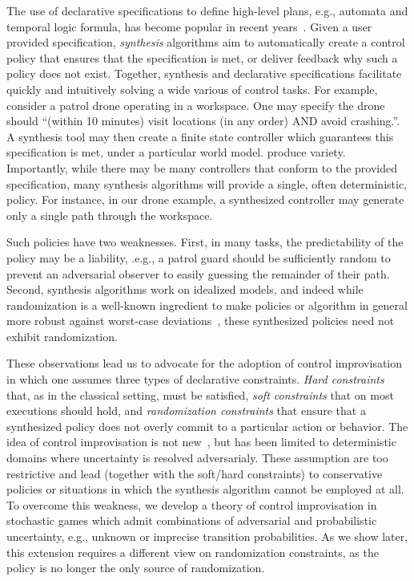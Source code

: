 The use of declarative specifications to define high-level plans, e.g.,
automata and temporal logic formula, has become popular in recent
years~\cite{DBLP:conf/iros/HorowitzWM14, DBLP:conf/rss/WongEK14, DBLP:conf/iros/HeLKV17, DBLP:conf/icra/FuATP16, DBLP:conf/icra/HeWKV19, DBLP:journals/arobots/MoarrefK20, DBLP:conf/icra/KantarosM0P20}.
Given a user provided specification, \emph{synthesis} algorithms aim
to automatically create a control policy that ensures that the
specification is met, or deliver feedback why such a policy does not
exist. Together, synthesis and declarative specifications facilitate
quickly and intuitively solving a wide various of control tasks.  For
example, consider a patrol drone operating in a workspace. One may
specify the drone should ``(within 10 minutes) visit locations (in any
order) AND avoid crashing.''. A synthesis tool may then create a
finite state controller which guarantees this specification is met,
under a particular world model.  %
produce variety.  Importantly, while there may be many controllers
that conform to the provided specification, many synthesis algorithms
will provide a single, often deterministic, policy.  For instance, in
our drone example, a synthesized controller may generate only a
single path through the workspace.

Such policies have two weaknesses. First, in many tasks, the
predictability of the policy may be a liability, .e.g., a patrol guard
should be sufficiently random to prevent an adversarial observer to
easily guessing the remainder of their path. Second, synthesis
algorithms work on idealized models, and indeed while randomization is
a well-known ingredient to make policies or algorithm in general more
robust against worst-case
deviations~\cite{mceThesis, maxEntAnswer},
these synthesized policies need not exhibit randomization.

These observations lead us to advocate for the adoption of control
improvisation in which one assumes three types of declarative
constraints. \emph{Hard constraints} that, as in the classical
setting, must be satisfied, \emph{soft constraints} that on most
executions should hold, and \emph{randomization constraints} that
ensure that a synthesized policy does not overly commit to a
particular action or behavior. The idea of control improvisation is
not new~\cite{DBLP:conf/cav/FremontS18,DBLP:conf/fsttcs/FremontDSW15},
but has been limited to deterministic domains where uncertainty is
resolved adversarialy. These assumption are too restrictive and lead
(together with the soft/hard constraints) to conservative policies or
situations in which the synthesis algorithm cannot be employed at
all. To overcome this weakness, we develop a theory of control
improvisation in stochastic games which admit combinations of
adversarial and probabilistic uncertainty, e.g., unknown or imprecise
transition probabilities. As we show later, this extension requires a
different view on randomization constraints, as the policy is no
longer the only source of randomization.

